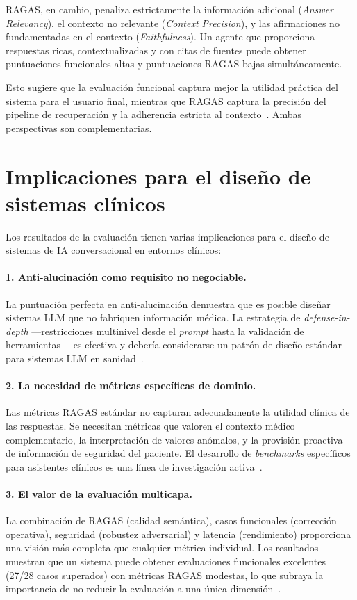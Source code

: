 \ac{RAGAS}, en cambio, penaliza estrictamente la información adicional (\textit{Answer Relevancy}), el contexto no relevante (\textit{Context Precision}), y las afirmaciones no fundamentadas en el contexto (\textit{Faithfulness}). Un agente que proporciona respuestas ricas, contextualizadas y con citas de fuentes puede obtener puntuaciones funcionales altas y puntuaciones \ac{RAGAS} bajas simultáneamente.

Esto sugiere que la evaluación funcional captura mejor la utilidad práctica del sistema para el usuario final, mientras que \ac{RAGAS} captura la precisión del pipeline de recuperación y la adherencia estricta al contexto~\parencite{Gan2025rageval}. Ambas perspectivas son complementarias.


\section{Implicaciones para el diseño de sistemas clínicos}

Los resultados de la evaluación tienen varias implicaciones para el diseño de sistemas de \ac{IA} conversacional en entornos clínicos:

\paragraph{1. Anti-alucinación como requisito no negociable.} La puntuación perfecta en anti-alucinación demuestra que es posible diseñar sistemas \ac{LLM} que no fabriquen información médica. La estrategia de \textit{defense-in-depth} ---restricciones multinivel desde el \textit{prompt} hasta la validación de herramientas--- es efectiva y debería considerarse un patrón de diseño estándar para sistemas \ac{LLM} en sanidad~\parencite{kim2025hallucination,Song2025trustehragent}.

\paragraph{2. La necesidad de métricas específicas de dominio.} Las métricas \ac{RAGAS} estándar no capturan adecuadamente la utilidad clínica de las respuestas. Se necesitan métricas que valoren el contexto médico complementario, la interpretación de valores anómalos, y la provisión proactiva de información de seguridad del paciente. El desarrollo de \textit{benchmarks} específicos para asistentes clínicos es una línea de investigación activa~\parencite{AgentClinic2025}.

\paragraph{3. El valor de la evaluación multicapa.} La combinación de \ac{RAGAS} (calidad semántica), casos funcionales (corrección operativa), seguridad (robustez adversarial) y latencia (rendimiento) proporciona una visión más completa que cualquier métrica individual. Los resultados muestran que un sistema puede obtener evaluaciones funcionales excelentes (27/28 casos superados) con métricas \ac{RAGAS} modestas, lo que subraya la importancia de no reducir la evaluación a una única dimensión~\parencite{Gan2025rageval}.

